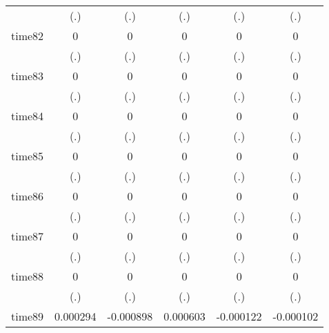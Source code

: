 \begin{table}[htbp]
\begin{tabular}{l*{5}{c}}
            &         (.)         &         (.)         &         (.)         &         (.)         &         (.)         \\
time82      &           0         &           0         &           0         &           0         &           0         \\
            &         (.)         &         (.)         &         (.)         &         (.)         &         (.)         \\
time83      &           0         &           0         &           0         &           0         &           0         \\
            &         (.)         &         (.)         &         (.)         &         (.)         &         (.)         \\
time84      &           0         &           0         &           0         &           0         &           0         \\
            &         (.)         &         (.)         &         (.)         &         (.)         &         (.)         \\
time85      &           0         &           0         &           0         &           0         &           0         \\
            &         (.)         &         (.)         &         (.)         &         (.)         &         (.)         \\
time86      &           0         &           0         &           0         &           0         &           0         \\
            &         (.)         &         (.)         &         (.)         &         (.)         &         (.)         \\
time87      &           0         &           0         &           0         &           0         &           0         \\
            &         (.)         &         (.)         &         (.)         &         (.)         &         (.)         \\
time88      &           0         &           0         &           0         &           0         &           0         \\
            &         (.)         &         (.)         &         (.)         &         (.)         &         (.)         \\
time89      &    0.000294         &   -0.000898         &    0.000603         &   -0.000122         &   -0.000102         \\

\end{tabular}
\end{table}
